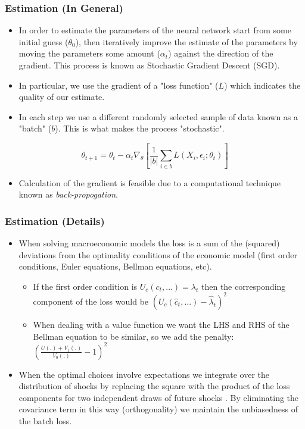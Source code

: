\documentclass{beamer}
\begin{document}
\begin{frame}
    \frametitle{Estimation (In General)}
    \begin{itemize}
        \item In order to estimate the parameters of the neural network start from some initial guess ($\theta_0$), then iteratively improve the estimate of the parameters by moving the parameters some amount ($\alpha_t$) against the direction of the gradient. This process is known as Stochastic Gradient Descent (SGD).
        \item In particular, we use the gradient of a "loss function" ($L$) which indicates the quality of our estimate.
        \item In each step we use a different randomly selected sample of data known as a "batch" ($b$). This is what makes the process "stochastic".
    \end{itemize}
    
    \begin{equation}
        \theta_{t+1} = \theta_{t} - \alpha_t \nabla_\theta \left[\frac{1}{|b|} \sum_{i \in b} L(X_i, \epsilon_i; \theta_t)\right]
    \end{equation}

    \begin{itemize}
        \item Calculation of the gradient is feasible due to a computational technique known as \textit{back-propogation}.
    \end{itemize}
\end{frame}

\begin{frame}
    \frametitle{Estimation (Details)}
    \begin{itemize}
        \item When solving macroeconomic models the loss is a sum of the (squared) deviations from the optimality conditions of the economic model (first order conditions, Euler equations, Bellman equations, etc).
        \begin{itemize}
            \item If the first order condition is $U_c(c_t,...) = \lambda_t$ then the corresponding component of the loss would be $(U_c(\hat{c}_t,...) - \hat{\lambda}_t)^2$
            \item When dealing with a value function we want the LHS and RHS of the Bellman equation to be similar, so we add the penalty: $\left(\frac{U(.) + V_1(.)}{V_0(.)} - 1\right)^2$
        \end{itemize}
        \item When the optimal choices involve expectations we integrate over the distribution of shocks by replacing the square with the product of the loss components for two independent draws of future shocks \parencite{maliar2021deep}. By eliminating the covariance term in this way (orthogonality) we maintain the unbiasedness of the batch loss.
    \end{itemize}
\end{frame}
\end{document}
